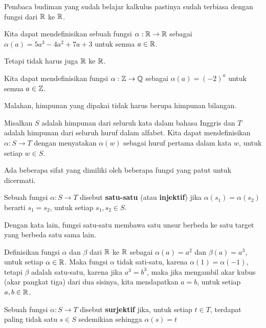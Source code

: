 Pembaca budiman yang sudah belajar kalkulus pastinya sudah terbiasa dengan fungsi dari $\mathbb{R}$ ke $\mathbb{R}$.

\begin{exmp}
Kita dapat mendefinisikan sebuah fungsi $\alpha : \mathbb{R} \rightarrow \mathbb{R}$ sebagai $\alpha(a) = 5a^3 - 4a^2 + 7a + 3$ untuk semua $a \in \mathbb{R}$.
\end{exmp}

Tetapi tidak harus juga $\mathbb{R}$ ke $\mathbb{R}$.

\begin{exmp}
Kita dapat mendefinisikan fungsi $\alpha : \mathbb{Z} \rightarrow \mathbb{Q}$ sebagai $\alpha(a) = (-2)^a$ untuk semua $a \in \mathbb{Z}$.
\end{exmp}

Malahan, himpunan yang dipakai tidak harus berupa himpunan bilangan.

\begin{exmp}
Misalkan $S$ adalah himpunan dari seluruh kata dalam bahasa Inggris dan $T$ adalah himpunan dari seluruh huruf dalam alfabet. Kita dapat mendefinisikan $\alpha : S \rightarrow T$ dengan menyatakan $\alpha(w)$ sebagai huruf pertama dalam kata $w$, untuk setiap $w \in S$.
\end{exmp}

Ada beberapa sifat yang dimiliki oleh beberapa fungsi yang patut untuk dicermati.

\begin{defn}
Sebuah fungsi $\alpha : S \rightarrow T$ disebut \textbf{satu-satu} (atau \textbf{injektif}) jika $\alpha(s_1) = \alpha(s_2)$ berarti $s_1 = s_2$, untuk setiap $s_1, s_2 \in S$.
\end{defn}

Dengan kata lain, fungsi satu-satu membawa satu unsur berbeda ke satu target yang berbeda satu sama lain.

\begin{exmp}
\label{exmp1.24}
Definisikan fungsi $\alpha$ dan $\beta$ dari $\mathbb{R}$ ke $\mathbb{R}$ sebagai $\alpha(a) = a^2$ dan $\beta(a) = a^3$, untuk setiap $\alpha \in \mathbb{R}$. Maka fungsi $\alpha$ tidak sati-satu, karena $\alpha(1) = \alpha(-1)$, tetapi $\beta$ adalah satu-satu, karena jika $a^3 = b^3$, maka jika mengambil akar kubus (akar pangkat tiga) dari dua sisinya, kita mendapatkan $a = b$, untuk setiap $a,b \in \mathbb{R}$.
\end{exmp}

\begin{defn}
Sebuah fungsi $\alpha : S \rightarrow T$ disebut \textbf{surjektif} jika, untuk setiap $t \in T$, terdapat paling tidak satu $s \in S$ sedemikian sehingga $\alpha(s) = t$
\end{defn}


